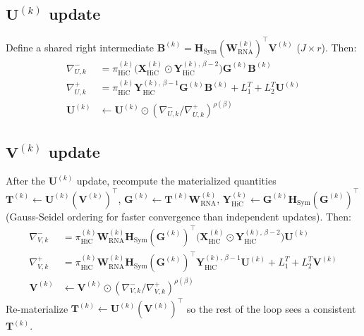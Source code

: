 \documentclass[11pt]{article}
\newcommand{\mat}[1]{\mathbf{#1}}
\newcommand{\Hada}{\odot}
\newcommand{\sci}[1]{\mathrm{#1}}
\begin{document}
\subsection{$\mat{U}^{(k)}$ update}\label{sec:U}

Define a shared right intermediate $\mat{B}^{(k)} = \mat{H}_{\sci{Sym}} (\mat{W}_{\sci{RNA}}^{(k)})^\top \mat{V}^{(k)}$ ($J \times r$). Then:
\begin{align}
\nabla^-_{U, k} &= \pi_{\sci{HiC}}^{(k)} \big( \mat{X}_{\sci{HiC}}^{(k)} \Hada \mat{Y}_{\sci{HiC}}^{(k),\,\beta-2} \big) \mat{G}^{(k)} \mat{B}^{(k)} \\
\nabla^+_{U, k} &= \pi_{\sci{HiC}}^{(k)} \mat{Y}_{\sci{HiC}}^{(k),\,\beta-1} \mat{G}^{(k)} \mat{B}^{(k)}
                  + L_1^{T} + L_2^{T} \mat{U}^{(k)} \\
\mat{U}^{(k)} &\leftarrow \mat{U}^{(k)} \Hada
                          \left( \nabla^-_{U, k} \big/ \nabla^+_{U, k} \right)^{\rho(\beta)}
\end{align}

\subsection{$\mat{V}^{(k)}$ update}\label{sec:V}

After the $\mat{U}^{(k)}$ update, recompute the materialized quantities $\mat{T}^{(k)} \leftarrow \mat{U}^{(k)} (\mat{V}^{(k)})^\top$, $\mat{G}^{(k)} \leftarrow \mat{T}^{(k)} \mat{W}_{\sci{RNA}}^{(k)}$, $\mat{Y}_{\sci{HiC}}^{(k)} \leftarrow \mat{G}^{(k)} \mat{H}_{\sci{Sym}} (\mat{G}^{(k)})^\top$ (Gauss-Seidel ordering for faster convergence than independent updates). Then:
\begin{align}
\nabla^-_{V, k} &= \pi_{\sci{HiC}}^{(k)} \mat{W}_{\sci{RNA}}^{(k)} \mat{H}_{\sci{Sym}} (\mat{G}^{(k)})^\top
                       \big( \mat{X}_{\sci{HiC}}^{(k)} \Hada \mat{Y}_{\sci{HiC}}^{(k),\,\beta-2} \big) \mat{U}^{(k)} \\
\nabla^+_{V, k} &= \pi_{\sci{HiC}}^{(k)} \mat{W}_{\sci{RNA}}^{(k)} \mat{H}_{\sci{Sym}} (\mat{G}^{(k)})^\top
                       \mat{Y}_{\sci{HiC}}^{(k),\,\beta-1} \mat{U}^{(k)}
                  + L_1^{T} + L_2^{T} \mat{V}^{(k)} \\
\mat{V}^{(k)} &\leftarrow \mat{V}^{(k)} \Hada
                          \left( \nabla^-_{V, k} \big/ \nabla^+_{V, k} \right)^{\rho(\beta)}
\end{align}
Re-materialize $\mat{T}^{(k)} \leftarrow \mat{U}^{(k)} (\mat{V}^{(k)})^\top$ so the rest of the loop sees a consistent $\mat{T}^{(k)}$.
\end{document}
